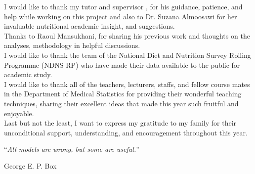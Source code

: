 \documentclass[
12pt, %
english, %
singlespacing, %
headsepline, %
table]{MastersDoctoralThesis} %
\begin{document}
\begin{acknowledgements}
\addchaptertocentry{\acknowledgementname} %
\vspace{0.8cm}
I would like to thank my tutor and supervisor \supname, for his guidance, patience, and help while working on this project and also to Dr. Suzana Almoosawi for her invaluable nutritional academic insight, and suggestions. \\

Thanks to Raoul Mansukhani, for sharing his previous work and thoughts on the analyses, methodology in helpful discussions.	 \\

I would like to thank the team of the National Diet and Nutrition Survey Rolling Programme (NDNS RP) who have made their data available to the public for academic study. \\

I would like to thank all of the teachers, lecturers, staffs, and fellow course mates in the Department of Medical Statistics for providing their wonderful teaching techniques, sharing their excellent ideas that made this year such fruitful and enjoyable.\\


Last but not the least, I want to express my gratitude to my family for their unconditional support, understanding, and encouragement throughout this year. \\

\end{acknowledgements}


\cleardoublepage


\vspace*{0.2\textheight}

\noindent\enquote{\itshape All models are wrong, but some are useful.}\bigbreak

\hfill George E. P. Box

\end{document}

